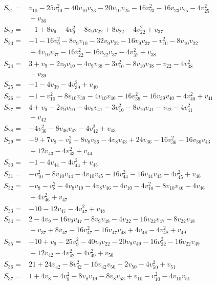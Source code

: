 \documentclass[11pt]{article}
\begin{document}
\begin{align*}
S_{21}={}&v_{10}-25v_{10}^{2}-40v_{10}v_{23}-20v_{10}v_{25}-16v_{23}^{2}-16v_{23}v_{25}-4v_{25}^{2}\\
&{}+v_{36}\\
S_{22}={}&-1+8v_{9}-4v_{9}^{2}-8v_{9}v_{22}+8v_{22}-4v_{22}^{2}+v_{37}\\
S_{23}={}&-1-16v_{9}^{2}-8v_{9}v_{10}-32v_{9}v_{22}-16v_{9}v_{37}-v_{10}^{2}-8v_{10}v_{22}\\
&{}-4v_{10}v_{37}-16v_{22}^{2}-16v_{22}v_{37}-4v_{37}^{2}+v_{38}\\
S_{24}={}&3+v_{9}-2v_{9}v_{10}-4v_{9}v_{38}-3v_{10}^{2}-8v_{10}v_{38}-v_{22}-4v_{38}^{2}\\
&{}+v_{39}\\
S_{25}={}&-1-4v_{39}-4v_{39}^{2}+v_{40}\\
S_{26}={}&-1-v_{10}^{2}-8v_{10}v_{39}-4v_{10}v_{40}-16v_{39}^{2}-16v_{39}v_{40}-4v_{40}^{2}+v_{41}\\
S_{27}={}&4+v_{9}-2v_{9}v_{10}-4v_{9}v_{41}-3v_{10}^{2}-8v_{10}v_{41}-v_{22}-4v_{41}^{2}\\
&{}+v_{42}\\
S_{28}={}&-4v_{36}^{2}-8v_{36}v_{42}-4v_{42}^{2}+v_{43}\\
S_{29}={}&-9+7v_{8}-v_{8}^{2}-8v_{8}v_{36}-4v_{8}v_{43}+24v_{36}-16v_{36}^{2}-16v_{36}v_{43}\\
&{}+12v_{43}-4v_{43}^{2}+v_{44}\\
S_{30}={}&-1-4v_{44}-4v_{44}^{2}+v_{45}\\
S_{31}={}&-v_{10}^{2}-8v_{10}v_{44}-4v_{10}v_{45}-16v_{44}^{2}-16v_{44}v_{45}-4v_{45}^{2}+v_{46}\\
S_{32}={}&-v_{8}-v_{8}^{2}-4v_{8}v_{10}-4v_{8}v_{46}-4v_{10}-4v_{10}^{2}-8v_{10}v_{46}-4v_{46}\\
&{}-4v_{46}^{2}+v_{47}\\
S_{33}={}&-10-12v_{47}-4v_{47}^{2}+v_{48}\\
S_{34}={}&2-4v_{9}-16v_{9}v_{47}-8v_{9}v_{48}-4v_{22}-16v_{22}v_{47}-8v_{22}v_{48}\\
&{}-v_{37}+8v_{47}-16v_{47}^{2}-16v_{47}v_{48}+4v_{48}-4v_{48}^{2}+v_{49}\\
S_{35}={}&-10+v_{9}-25v_{9}^{2}-40v_{9}v_{22}-20v_{9}v_{49}-16v_{22}^{2}-16v_{22}v_{49}\\
&{}-12v_{42}-4v_{42}^{2}-4v_{49}^{2}+v_{50}\\
S_{36}={}&21+24v_{42}-8v_{42}^{2}-16v_{42}v_{50}-2v_{50}-4v_{50}^{2}+v_{51}\\
S_{37}={}&1+4v_{8}-4v_{8}^{2}-8v_{8}v_{19}-8v_{8}v_{53}+v_{10}-v_{10}^{2}-4v_{10}v_{51}\\

\end{align*}
\end{document}
